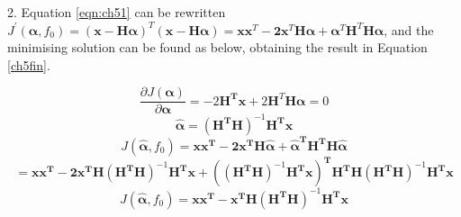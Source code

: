 \begin{flushleft}
2. Equation \ref{eqn:ch51} can be rewritten $J^{\prime}\left(\boldsymbol{\alpha}, f_{0}\right)=(\boldsymbol{x}-\boldsymbol{H} \boldsymbol{\alpha})^{T}(\boldsymbol{x}-\boldsymbol{H} \boldsymbol{\alpha})=\boldsymbol{x} \boldsymbol{x}^{T}-\boldsymbol{2} \boldsymbol{x}^{T} \boldsymbol{H} \boldsymbol{\alpha}+\boldsymbol{\alpha}^{T} \boldsymbol{H}^{T} \boldsymbol{H} \boldsymbol{\alpha}$, and the minimising solution can be found as below, obtaining the result in Equation \ref{ch5fin}.\end{flushleft}
\vspace{-0.05cm}
\begin{equation}
\frac{\partial J(\boldsymbol{\alpha})}{\partial \boldsymbol{\alpha}}=-2 \boldsymbol{H}^{\boldsymbol{T}} \boldsymbol{x} + 2 \boldsymbol{H}^{T}\boldsymbol{H} \boldsymbol{\alpha}=0
\end{equation}
\vspace{-0.2cm}
\begin{equation}
\hat{\boldsymbol{\alpha}}=\left(\boldsymbol{H}^{\boldsymbol{T}} \boldsymbol{H}\right)^{-1} \boldsymbol{H}^{\boldsymbol{T}} \boldsymbol{x}
\end{equation}
\vspace{-0.2cm}
\begin{equation}
J\left(\hat{\boldsymbol{\alpha}}, f_{0}\right)=\boldsymbol{x} \boldsymbol{x}^{\boldsymbol{T}}-\boldsymbol{2} \boldsymbol{x}^{\boldsymbol{T}} \boldsymbol{H} \hat{\boldsymbol{\alpha}}+\hat{\boldsymbol{\alpha}}^{\boldsymbol{T}} \boldsymbol{H}^{\boldsymbol{T}} \boldsymbol{H} \hat{\boldsymbol{\alpha}}
\end{equation}
\vspace{-0.2cm}
\begin{equation}
=\boldsymbol{x} \boldsymbol{x}^{\boldsymbol{T}}-\mathbf{2} \boldsymbol{x}^{\boldsymbol{T}} \boldsymbol{H}\left(\boldsymbol{H}^{\boldsymbol{T}} \boldsymbol{H}\right)^{-1} \boldsymbol{H}^{\boldsymbol{T}} \boldsymbol{x}+\left(\left(\boldsymbol{H}^{\boldsymbol{T}} \boldsymbol{H}\right)^{-1} \boldsymbol{H}^{\boldsymbol{T}} \boldsymbol{x}\right)^{\boldsymbol{T}} \boldsymbol{H}^{\boldsymbol{T}} \boldsymbol{H}\left(\boldsymbol{H}^{\boldsymbol{T}} \boldsymbol{H}\right)^{-1} \boldsymbol{H}^{\boldsymbol{T}} \boldsymbol{x}
\end{equation}
\vspace{-0.2cm}
\begin{equation}
J\left(\hat{\boldsymbol{\alpha}}, f_{0}\right)=\boldsymbol{x} \boldsymbol{x}^{\boldsymbol{T}}-\boldsymbol{x}^{\boldsymbol{T}} \boldsymbol{H}\left(\boldsymbol{H}^{\boldsymbol{T}} \boldsymbol{H}\right)^{-1} \boldsymbol{H}^{\boldsymbol{T}} \boldsymbol{x}
\label{ch5fin}
\end{equation}

